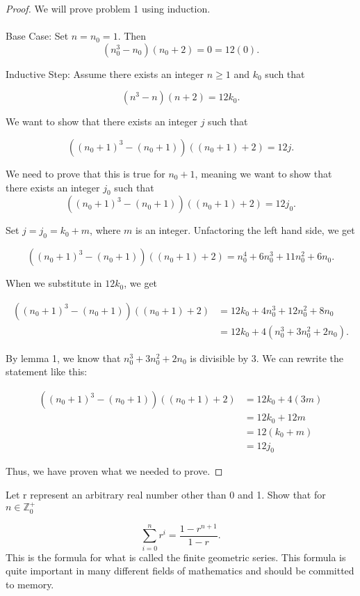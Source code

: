 \documentclass[12pt]{article}
\newenvironment{problem}[2][Problem]{\begin{trivlist}
\item[\hskip \labelsep {\bfseries #1}\hskip \labelsep {\bfseries #2.}]}{\end{trivlist}}
\begin{document}
\begin{proof} We will prove problem 1 using induction. \\ \\
    Base Case: Set $n = n_0 = 1$. Then
    $$(n_0^3 - n_0)(n_0 + 2) = 0 = 12(0).$$

    \noindent Inductive Step: Assume there exists an integer $n \geq 1$ and $k_0$ such that

    $$(n^3 - n)(n + 2) = 12k_0.$$

    We want to show that there exists an integer $j$ such that

    $$((n_0+1)^3 - (n_0+1))((n_0+1) + 2) = 12j.$$
    
    We need to prove that this is true for $n_0 + 1$, meaning we want to show that there exists an integer $j_0$ such that
    $$((n_0+1)^3 - (n_0+1))((n_0+1) + 2) = 12j_0.$$

    Set $j = j_0 = k_0 + m$, where $m$ is an integer. Unfactoring the left hand side, we get 

    $$((n_0+1)^3 - (n_0+1))((n_0+1) + 2) = n_0^4 + 6n_0^3 + 11n_0^2 + 6n_0.$$

    When we substitute in $12k_0$, we get

    \begin{align*}
        ((n_0+1)^3 - (n_0+1))((n_0+1) + 2) & = 12k_0 + 4n_0^3 + 12n_0^2 + 8n_0 \\
        & = 12k_0 + 4(n_0^3 + 3n_0^2 + 2n_0).
    \end{align*}

    By lemma 1, we know that $n_0^3 + 3n_0^2 + 2n_0$ is divisible by 3. We can rewrite the statement like this:

    \begin{align*}
        ((n_0+1)^3 - (n_0+1))((n_0+1) + 2) & = 12k_0 + 4(3m) \\
        & = 12k_0 + 12m \\
        & = 12(k_0 + m) \\
        & = 12j_0
    \end{align*}

    Thus, we have proven what we needed to prove.


\end{proof}





\newpage
\begin{problem}{2}
    Let r represent an arbitrary real number other than 0 and 1. Show that for $n \in \mathbb{Z}_0^+$

    $$\sum_{i=0}^{n} r^i = \frac{1 - r^{n+1}}{1 - r}.$$
    This is the formula for what is called the finite geometric series. This formula is quite important in many different fields of mathematics and should be committed to memory.

\end{problem}
\end{document}
